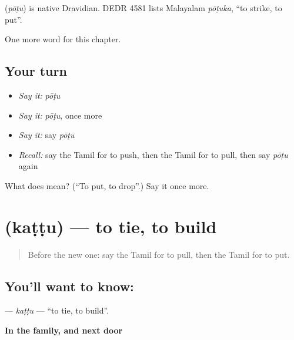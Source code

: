 \begin{cousinweb}
\textbf{} (\emph{pōṭu}) is native Dravidian. DEDR 4581 lists Malayalam \emph{pōṭuka}, \textquotedblleft{}to strike, to put\textquotedblright{}.
\end{cousinweb}

\begin{grammarlens}[title={What you've built}]
One more word for this chapter.
\end{grammarlens}

\subsection*{Your turn}
\begin{itemize}
\raggedright
  \item \emph{Say it:} \emph{pōṭu}
  \item \emph{Say it:} \emph{pōṭu}, once more
  \item \emph{Say it:} say \emph{pōṭu}
  \item \emph{Recall:} say the Tamil for to push, then the Tamil for to pull, then say \emph{pōṭu} again
\end{itemize}

\begin{tcolorbox}[breakable,colback=teal!4,colframe=teal!35!black,title={Before you move on}]
What does  mean? (\textquotedblleft{}To put, to drop\textquotedblright{}.) Say it once more.
\end{tcolorbox}
\section[\texorpdfstring{\ta{கட்டு} (kaṭṭu)}{கட்டு (kaṭṭu)}]{ (kaṭṭu) — to tie, to build}

\label{lesson:TA-C155-kattu2}



\begin{quote}
Before the new one: say the Tamil for to pull, then the Tamil for to put.
\end{quote}

\subsection*{You'll want to know: }
\textbf{} — \emph{kaṭṭu} — \textquotedblleft{}to tie, to build\textquotedblright{}.

\textbf{In the family, and next door}

